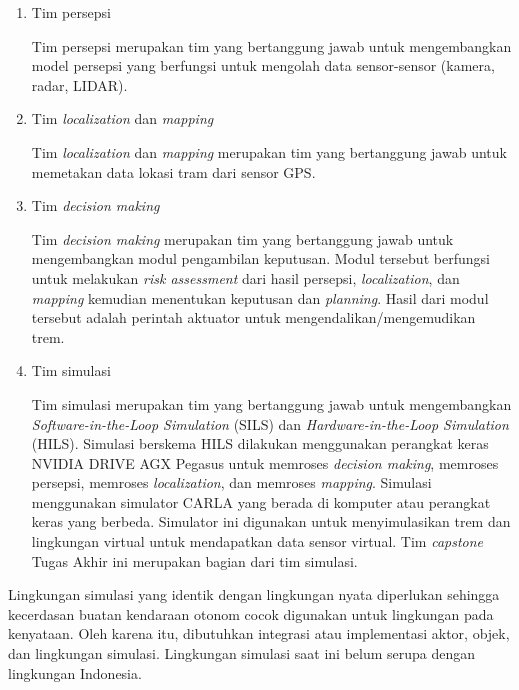 \begin{enumerate}

    \item Tim persepsi

    Tim persepsi merupakan tim yang bertanggung jawab untuk mengembangkan model
    persepsi yang berfungsi untuk mengolah data sensor-sensor (kamera, radar,
    LIDAR).

    \item Tim \textit{localization} dan \textit{mapping}

    Tim \textit{localization} dan \textit{mapping} merupakan tim yang
    bertanggung jawab untuk memetakan data lokasi tram dari sensor GPS.

    \item Tim \textit{decision making}

    Tim \textit{decision making} merupakan tim yang bertanggung jawab untuk
    mengembangkan modul pengambilan keputusan. Modul tersebut berfungsi untuk
    melakukan \textit{risk assessment} dari hasil persepsi,
    \textit{localization}, dan \textit{mapping} kemudian menentukan keputusan
    dan \textit{planning}. Hasil dari modul tersebut adalah perintah aktuator
    untuk mengendalikan/mengemudikan trem.

    \item Tim simulasi

    Tim simulasi merupakan tim yang bertanggung jawab untuk mengembangkan
    \textit{Software-in-the-Loop Simulation} (SILS) dan
    \textit{Hardware-in-the-Loop Simulation} (HILS). Simulasi berskema HILS
    dilakukan menggunakan perangkat keras NVIDIA DRIVE AGX Pegasus untuk
    memroses \textit{decision making}, memroses persepsi, memroses
    \textit{localization}, dan memroses \textit{mapping}. Simulasi menggunakan
    simulator CARLA yang berada di komputer atau perangkat keras yang berbeda.
    Simulator ini digunakan untuk menyimulasikan trem dan lingkungan virtual
    untuk mendapatkan data sensor virtual. Tim \textit{capstone} Tugas Akhir ini
    merupakan bagian dari tim simulasi.

\end{enumerate}

Lingkungan simulasi yang identik dengan lingkungan nyata diperlukan sehingga
kecerdasan buatan kendaraan otonom cocok digunakan untuk lingkungan pada
kenyataan. Oleh karena itu, dibutuhkan integrasi atau implementasi aktor, objek,
dan lingkungan simulasi. Lingkungan simulasi saat ini belum serupa dengan
lingkungan Indonesia.

